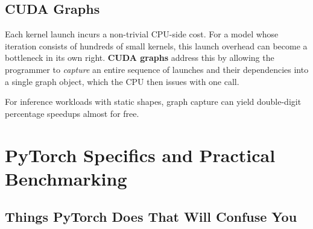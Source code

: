 \documentclass[11pt,a4paper]{article}
\theoremstyle{definition}
\theoremstyle{remark}
\theoremstyle{plain}
\begin{document}
\subsection{CUDA Graphs}

Each kernel launch incurs a non-trivial CPU-side cost. For a model
whose iteration consists of hundreds of small kernels, this launch
overhead can become a bottleneck in its own right. \textbf{CUDA
graphs} address this by allowing the programmer to \emph{capture} an
entire sequence of launches and their dependencies into a single
graph object, which the CPU then issues with one call.

\begin{center}
\end{center}

For inference workloads with static shapes, graph capture can yield
double-digit percentage speedups almost for free.

\section{PyTorch Specifics and Practical Benchmarking}

\subsection{Things PyTorch Does That Will Confuse You}
\end{document}
